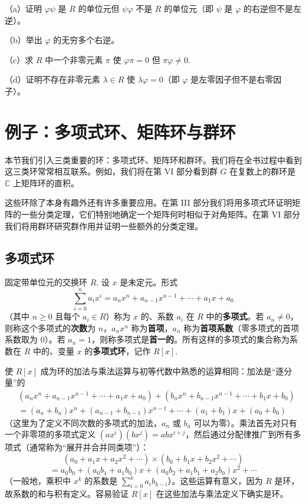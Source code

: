 \begin{enumerate}
（a）证明 \(\varphi\psi\) 是 \(R\) 的单位元但 \(\psi\varphi\) 不是 \(R\) 的单位元（即 \(\psi\) 是 \(\varphi\) 的右逆但不是左逆）。

（b）举出 \(\varphi\) 的无穷多个右逆。

（c）求 \(R\) 中一个非零元素 \(\pi\) 使 \(\varphi\pi = 0\) 但 \(\pi\varphi \neq 0\).

（d）证明不存在非零元素 \(\lambda \in R\) 使 \(\lambda\varphi = 0\)（即 \(\varphi\) 是左零因子但不是右零因子）。
\end{enumerate}

\section{例子：多项式环、矩阵环与群环}

本节我们引入三类重要的环：多项式环、矩阵环和群环。我们将在全书过程中看到这三类环常常相互联系。例如，我们将在第 VI 部分看到群 \(G\) 在复数上的群环是 \(\mathbb{C}\) 上矩阵环的直积。

这些环除了本身有趣外还有许多重要应用。在第 III 部分我们将用多项式环证明矩阵的一些分类定理，它们特别地确定一个矩阵何时相似于对角矩阵。在第 VI 部分我们将用群环研究群作用并证明一些额外的分类定理。

\subsection*{多项式环}

固定带单位元的交换环 \(R\). 设 \(x\) 是未定元。形式
\[
\sum_{i=0}^{n} a_i x^i = a_nx^n + a_{n-1}x^{n-1} + \cdots + a_1x + a_0
\]
（其中 \(n \geq 0\) 且每个 \(a_i \in R\)）称为 \(x\) 的、系数 \(a_i\) 在 \(R\) 中的\textbf{多项式}。若 \(a_n \neq 0\)，则称这个多项式的\textbf{次数}为 \(n\)，\(a_nx^n\) 称为\textbf{首项}，\(a_n\) 称为\textbf{首项系数}（零多项式的首项系数取为 0）。若 \(a_n = 1\)，则称多项式是\textbf{首一的}。所有这样的多项式的集合称为系数在 \(R\) 中的、变量 \(x\) 的\textbf{多项式环}，记作 \(R[x]\).

使 \(R[x]\) 成为环的加法与乘法运算与初等代数中熟悉的运算相同：加法是“逐分量”的
\[
\begin{aligned}
&(a_nx^n + a_{n-1}x^{n-1} + \cdots + a_1x + a_0) + (b_nx^n + b_{n-1}x^{n-1} + \cdots + b_1x + b_0) \\
&= (a_n+b_n)x^n + (a_{n-1}+b_{n-1})x^{n-1} + \cdots + (a_1+b_1)x + (a_0+b_0)
\end{aligned}
\]
（这里为了定义不同次数的多项式的加法，\(a_n\) 或 \(b_n\) 可以为零）。乘法首先对只有一个非零项的多项式定义 \((ax^i)(bx^j) = abx^{i+j}\)，然后通过分配律推广到所有多项式（通常称为“展开并合并同类项”）：
\[
(a_0 + a_1x + a_2x^2 + \cdots) \times (b_0 + b_1x + b_2x^2 + \cdots)
\]
\[
= a_0b_0 + (a_0b_1 + a_1b_0)x + (a_0b_2 + a_1b_1 + a_2b_0)x^2 + \cdots
\]
（一般地，乘积中 \(x^k\) 的系数是 \(\sum_{i=0}^{k} a_ib_{k-i}\)）。这些运算有意义，因为 \(R\) 是环，故系数的和与积有定义。容易验证 \(R[x]\) 在这些加法与乘法定义下确实是环。

